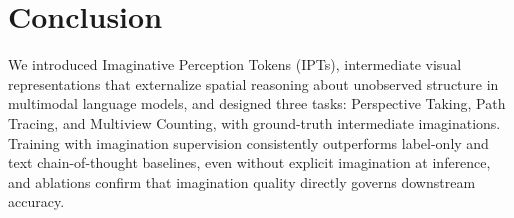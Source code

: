 \section{Conclusion}
\vspace{-0.5em}
\label{sec:conclusion}
We introduced Imaginative Perception Tokens (IPTs), intermediate visual representations that externalize spatial reasoning about unobserved structure in multimodal language models, and designed three tasks: Perspective Taking, Path Tracing, and Multiview Counting, with ground-truth intermediate imaginations. Training with imagination supervision consistently outperforms label-only and text chain-of-thought baselines, even without explicit imagination at inference, and ablations confirm that imagination quality directly governs downstream accuracy.
